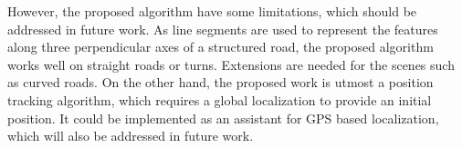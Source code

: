 \documentclass[letterpaper, 10 pt, conference]{ieeeconf}  %
\begin{document}
However, the proposed algorithm have some limitations, which should be addressed in future work. As line segments are used to represent the features along three perpendicular axes of a structured road, the proposed algorithm works well on straight roads or turns. Extensions are needed for the scenes such as curved roads. On the other hand, the proposed work is utmost a position tracking algorithm, which requires a global localization to provide an initial position. It could be implemented as an assistant for GPS based localization, which will also be addressed in future work.



\end{document}
